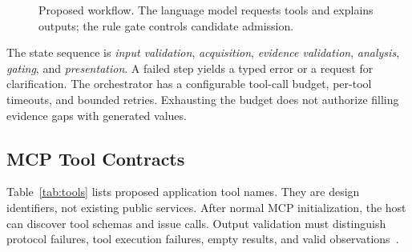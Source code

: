 \documentclass[conference]{IEEEtran}
\begin{document}
\begin{figure}[t]
\centering
{}
\caption{Proposed workflow. The language model requests tools and explains outputs; the rule gate controls candidate admission.}
\label{fig:architecture}
\end{figure}

The state sequence is \emph{input validation}, \emph{acquisition}, \emph{evidence validation}, \emph{analysis}, \emph{gating}, and \emph{presentation}. A failed step yields a typed error or a request for clarification. The orchestrator has a configurable tool-call budget, per-tool timeouts, and bounded retries. Exhausting the budget does not authorize filling evidence gaps with generated values.

\subsection{MCP Tool Contracts}
Table~\ref{tab:tools} lists proposed application tool names. They are design identifiers, not existing public services. After normal MCP initialization, the host can discover tool schemas and issue calls. Output validation must distinguish protocol failures, tool execution failures, empty results, and valid observations~\cite{mcp}.
\end{document}
